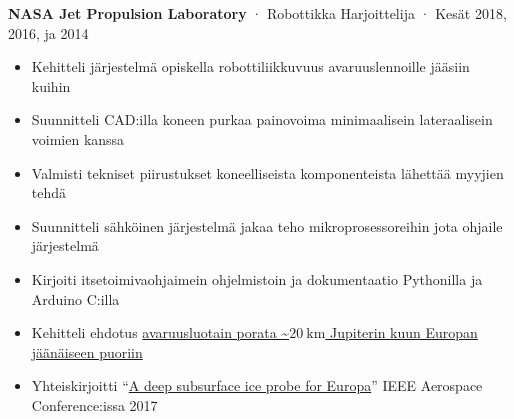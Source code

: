 \documentclass[12pt, oneside]{article}
\newcommand{\jobtitle}[3] {
	{\bf #1} · {#2} · {#3} \vspace{-7pt} \\
}
\begin{document}
\begin{flushleft}
\jobtitle{NASA Jet Propulsion Laboratory}{Robottikka Harjoittelija}{Kesät 2018, 2016, ja 2014}
\begin{itemize}
	\item Kehitteli järjestelmä opiskella robottiliikkuvuus avaruuslennoille jääsiin kuihin \\
	\item Suunnitteli CAD:illa koneen purkaa painovoima minimaalisein lateraalisein voimien kanssa \\
	\item Valmisti tekniset piirustukset koneelliseista komponenteista lähettää myyjien tehdä \\
	\item Suunnitteli sähköinen järjestelmä jakaa teho mikroprosessoreihin jota ohjaile järjestelmä \\
	\item Kirjoiti itsetoimivaohjaimein ohjelmistoin ja dokumentaatio Pythonilla ja Arduino C:illa \\
	\item Kehitteli ehdotus \href{https://portfolium.com/entry/owms-deep-subsurface-access-level-wind}{avaruusluotain porata \textasciitilde$\SI{20}{\kilo\meter}$ Jupiterin kuun Europan jäänäiseen puoriin} \\
	\item Yhteiskirjoitti ``\href{https://www.researchgate.net/publication/317702124_A_deep_subsurface_ice_probe_for_Europa}{A deep subsurface ice probe for Europa}'' IEEE Aerospace Conference:issa 2017 \\
\end{itemize}


\end{flushleft}
\end{document}
